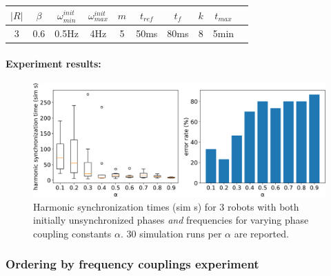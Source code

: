 			\begin{center}
			\begin{tabular}{ |c|c|c|c|c|c|c|c|c|c| } 
			\hline
			$|R|$ & $\beta$ & $\omega_{min}^{init}$ & $\omega_{max}^{init}$ & $m$ & $t_{ref}$ & $t_f$ & $k$ & $t_{max}$ \\
			\hline
			3 & 0.6 & 0.5Hz & 4Hz & 5 & 50ms & 80ms & 8 & 5min \\
			\hline
			\end{tabular}
			\label{tab:stable_baseline_reproducing_phase_and_freq_sync_for_alpha}
			\end{center}
			
			\paragraph{Experiment results:\nl}
			
			\begin{figure}[ht!]
				\centering
				\includegraphics[width=\linewidth]{Assets/DocSegments/Chapters/ExperimentsAndResults/Figures/PerfScores/stable_baseline_reproducing_phase_and_freq_sync_for_alpha.pdf}
				\caption[Experiment results for $\phi$ \& $\omega$ synchronization baseline reproduction and stabilization experiment.]{Harmonic synchronization times (sim s) for 3 robots with both initially unsynchronized phases \textit{and} frequencies for varying phase coupling constants $\alpha$. 30 simulation runs per $\alpha$ are reported.}
				\label{fig:stable_baseline_reproducing_phase_and_freq_sync_for_alpha}
			\end{figure}
			
			
	
		\subsubsection{Ordering by frequency couplings experiment}
		
